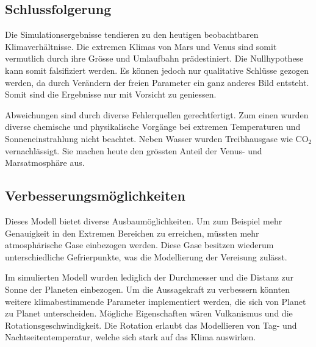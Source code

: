 \begin{refsection}
\section{Schlussfolgerung}

Die Simulationsergebnisse tendieren zu den heutigen beobachtbaren Klimaverhältnisse. Die extremen Klimas von Mars und Venus sind somit vermutlich durch ihre Grösse und Umlaufbahn prädestiniert. Die Nullhypothese kann somit falsifiziert werden. Es können jedoch nur qualitative Schlüsse gezogen werden, da durch Verändern der freien Parameter ein ganz anderes Bild entsteht. Somit sind die Ergebnisse nur mit Vorsicht zu geniessen.

Abweichungen sind durch diverse Fehlerquellen gerechtfertigt. Zum einen wurden diverse chemische und physikalische Vorgänge bei extremen Temperaturen und Sonneneinstrahlung nicht beachtet.
Neben Wasser wurden Treibhausgase wie CO$_2$ vernachlässigt. Sie machen heute den grössten Anteil der Venus- und Marsatmosphäre aus.

\subsection{Verbesserungsmöglichkeiten}

Dieses Modell bietet diverse Ausbaumöglichkeiten. Um zum Beispiel mehr Genauigkeit in den Extremen Bereichen zu erreichen, müssten mehr atmosphärische Gase einbezogen werden.
Diese Gase besitzen wiederum unterschiedliche Gefrierpunkte, was die Modellierung der Vereisung zulässt.
		
Im simulierten Modell wurden lediglich der Durchmesser und die Distanz zur Sonne der Planeten einbezogen. Um die Aussagekraft zu verbessern könnten weitere klimabestimmende Parameter implementiert werden, die sich von Planet zu Planet unterscheiden. Mögliche Eigenschaften wären Vulkanismus und die Rotationsgeschwindigkeit. Die Rotation erlaubt das Modellieren von Tag- und Nachtseitentemperatur, welche sich stark auf das Klima auswirken.

\printbibliography[heading=subbibliography]
\end{refsection}
